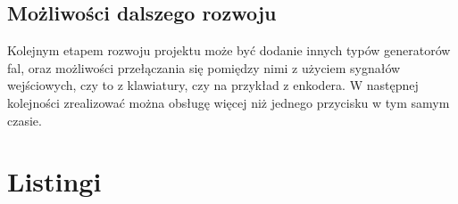 \documentclass[12pt]{article}
\begin{document}
\subsection{Możliwości dalszego rozwoju}
Kolejnym etapem rozwoju projektu może być dodanie innych typów generatorów fal, oraz możliwości przełączania się pomiędzy nimi z użyciem sygnałów wejściowych, czy to z klawiatury, czy na przykład z enkodera. W następnej kolejności zrealizować można obsługę więcej niż jednego przycisku w tym samym czasie.

\clearpage
\section{Listingi}




\end{document}
